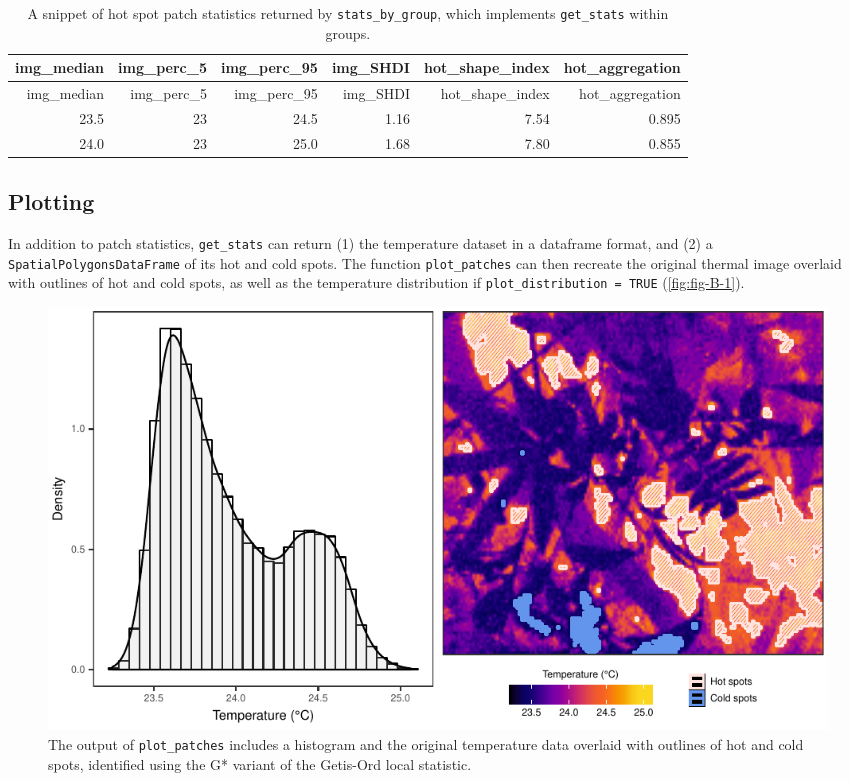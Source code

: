 \documentclass[12pt,british,a4paper,]{article}
\newenvironment{Shaded}{\begin{snugshade}}{\end{snugshade}}
\newcommand{\CommentTok}[1]{\textcolor[rgb]{0.56,0.35,0.01}{\textit{#1}}}
\newcommand{\DataTypeTok}[1]{\textcolor[rgb]{0.13,0.29,0.53}{#1}}
\newcommand{\KeywordTok}[1]{\textcolor[rgb]{0.13,0.29,0.53}{\textbf{#1}}}
\newcommand{\NormalTok}[1]{#1}
\newcommand{\OperatorTok}[1]{\textcolor[rgb]{0.81,0.36,0.00}{\textbf{#1}}}
\newcommand{\OtherTok}[1]{\textcolor[rgb]{0.56,0.35,0.01}{#1}}
\begin{document}
\begin{longtable}[]{@{}rrrrrr@{}}
\caption{A snippet of hot spot patch statistics returned by \texttt{stats\_by\_group}, which implements \texttt{get\_stats} within groups.}\tabularnewline
\toprule
img\_median & img\_perc\_5 & img\_perc\_95 & img\_SHDI & hot\_shape\_index & hot\_aggregation\tabularnewline
\midrule
\endfirsthead
\toprule
img\_median & img\_perc\_5 & img\_perc\_95 & img\_SHDI & hot\_shape\_index & hot\_aggregation\tabularnewline
\midrule
\endhead
23.5 & 23 & 24.5 & 1.16 & 7.54 & 0.895\tabularnewline
24.0 & 23 & 25.0 & 1.68 & 7.80 & 0.855\tabularnewline
\bottomrule
\end{longtable}

\hypertarget{plotting}{%
\subsection{Plotting}\label{plotting}}

In addition to patch statistics, \texttt{get\_stats} can return (1) the temperature dataset in a dataframe format, and (2) a \texttt{SpatialPolygonsDataFrame} of its hot and cold spots. The function \texttt{plot\_patches} can then recreate the original thermal image overlaid with outlines of hot and cold spots, as well as the temperature distribution if \texttt{plot\_distribution\ =\ TRUE} (\autoref{fig:fig-B-1}).



\begin{Shaded}
\end{Shaded}

\begin{figure}[H]

{\centering \includegraphics{./output/fig-B-1-1} 

}

\caption{The output of \texttt{plot\_patches} includes a histogram and the original temperature data overlaid with outlines of hot and cold spots, identified using the G* variant of the Getis-Ord local statistic.}\label{fig:fig-B-1}
\end{figure}
\end{document}
